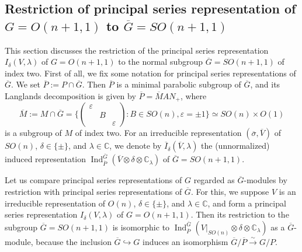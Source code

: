 \subsection{Restriction of principal series representation
 of $G=O(n+1,1)$ to $\overline G=SO(n+1,1)$ }
\label{subsec:psrest}
This section discusses the restriction of the principal series representation $I_{\delta}(V, \lambda)$
 of $G=O(n+1,1)$ to the normal subgroup $\overline G= SO(n+1,1)$ of index two.  
First of all, 
 we fix some notation 
 for principal series representations of $\overline G$.  
We set 
$\overline P := P \cap \overline G$. 
Then $\overline P$ is a minimal parabolic subgroup of $\overline G$, 
 and its Langlands decomposition is given
 by $\overline P = \overline M A N_+$, 
 where 
\[
\overline M := M \cap \overline G
=
\{ 
\begin{pmatrix}
               \varepsilon & &
\\
                           & B & 
\\
                           & & \varepsilon
\end{pmatrix}
:
B \in SO(n), \varepsilon= \pm 1
\}
\simeq
SO(n) \times O(1)
\]
 is a subgroup of $M$ of index two.  
For an irreducible representation $(\overline\sigma, \overline V)$ of $SO(n)$, 
 $\delta \in \{\pm\}$, 
 and $\lambda \in {\mathbb{C}}$, 
 we denote by 
$\overline I_{\delta}(\overline V,\lambda)$
 the (unnormalized) induced representation
$
    \operatorname{Ind}_{\overline P}^{\overline G}
    (\overline V \otimes \delta \otimes {\mathbb{C}}_{\lambda})
$
 of $\overline G =SO(n+1,1)$.  



Let us compare principal series representations of $G$
 regarded as $\overline G$-modules
 by restriction with principal series representations of $\overline G$.  
For this, 
 we suppose $V$ is an irreducible representation of $O(n)$, 
 $\delta \in \{\pm \}$, and $\lambda \in {\mathbb{C}}$, 
 and form a principal series representation $I_{\delta}(V,\lambda)$
 of $G=O(n+1,1)$.  
Then its restriction to the subgroup $\overline G=SO(n+1,1)$ is isomorphic to 
$
   \operatorname{Ind}_{\overline P}^{\overline G}
   (V|_{SO(n)} \otimes \delta \otimes {\mathbb{C}}_{\lambda})
$
 as a $\overline G$-module, 
 because the inclusion $\overline G \hookrightarrow G$
 induces an isomorphism
 $\overline G/\overline P \overset \sim \to G/P$.  



